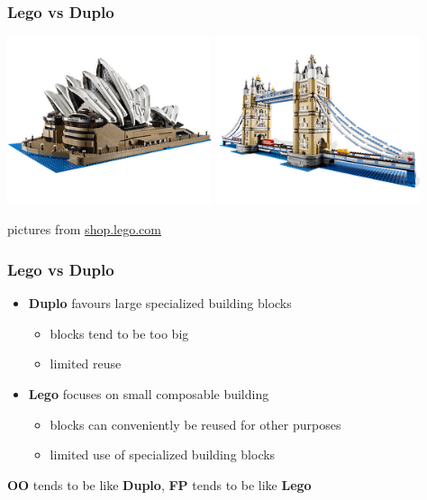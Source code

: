 \documentclass{beamer}
\begin{document}
\begin{frame}
  \frametitle{Lego vs Duplo}
  \begin{center}
    \includegraphics[width=0.45\textwidth]{../images/lego-sydney-opera.jpg}
    \includegraphics[width=0.45\textwidth]{../images/lego-tower-bridge.jpg}
  \end{center}
  \vfill
  \begin{center}
    {\tiny pictures from \url{shop.lego.com}}
  \end{center}
\end{frame}

\begin{frame}
  \frametitle{Lego vs Duplo}
  \begin{itemize}
  \item<1-> \textbf{Duplo} favours large specialized building blocks
    \begin{itemize}
    \item<1-> blocks tend to be too big
    \item<1-> limited reuse
    \end{itemize}
  \item<2-> \textbf{Lego} focuses on small composable building
    \begin{itemize}
    \item<2-> blocks can conveniently be reused for other purposes
    \item<2-> limited use of specialized building blocks
    \end{itemize}
  \end{itemize}
  \vfill
  \begin{center}
    \textbf{OO} tends to be like \textbf{Duplo}, \textbf{FP} tends to
    be like \textbf{Lego}
  \end{center}

\end{frame}
\end{document}
